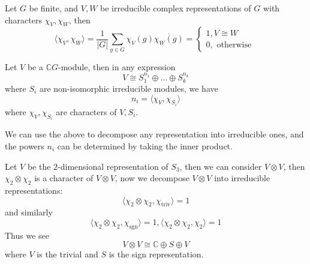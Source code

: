 \documentclass[openany]{book}
\newcommand{\C}{\mathbb{C}}
\newcommand{\la}{\langle}
\newcommand{\ra}{\rangle}
\begin{document}
\begin{prop}
    Let $G$ be finite, and $V,W$ be irreducible complex representations of $G$ with characters $\chi_V,\chi_W$, then 
    \begin{equation*}
        \la \chi_V,\chi_W\ra=\frac{1}{|G|}\sum_{g\in G}\chi_V(g)\overline{\chi_W(g)}=\begin{cases}
            1, V\cong W\\
            0, \text{ otherwise }
        \end{cases}
    \end{equation*}
\end{prop}

\begin{prop}
    Let $V$ be a $\C G$-module, then in any expression 
    \begin{equation*}
        V\cong S_1^{n_1}\oplus\dots\oplus S_k^{n_k}
    \end{equation*}
    where $S_i$ are non-isomorphic irreducible modules, we have 
    \begin{equation*}
        n_i=\la \chi_V,\chi_{S_i}\ra
    \end{equation*}
    where $\chi_V,\chi_{S_i}$ are characters of $V,S_i$. 
\end{prop}
\begin{warn}
    We can use the above to decompose any representation into irreducible ones, and the powers $n_i$ can be determined by taking the inner product.
\end{warn}

\begin{example}
    Let $V$ be the $2$-dimensional representation of $S_3$, then we can consider $V\otimes V$, then $\chi_2\otimes\chi_2$ is a character of $V\otimes V$, now we decompose $V\otimes V$ into irreducible representations:
    \begin{equation*}
        \la \chi_2\otimes\chi_2, \chi_{\text{triv}}\ra=1
    \end{equation*}
    and similarly 
    \begin{equation*}
        \la \chi_2\otimes\chi_2, \chi_{\text{sgn}}\ra=1,  \la \chi_2\otimes\chi_2, \chi_2\ra=1
    \end{equation*}
    Thus we see 
    \begin{equation*}
        V\otimes V\cong \C\oplus S\oplus V
    \end{equation*}
    where $V$ is the trivial and $S$ is the sign representation.
\end{example}
\end{document}
